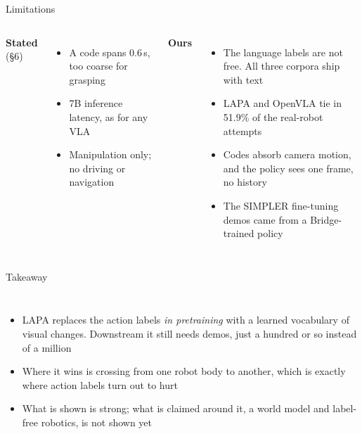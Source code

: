 \documentclass[aspectratio=169,12pt]{beamer}
\newcommand{\lapa}[1]{{\color{lapa}#1}}
\begin{document}
\begin{frame}{Limitations}
  \begin{columns}[t]
      {\small\bfseries Stated} {\scriptsize\color{mute}(\S6)}
      \footnotesize
      \begin{itemize}\setlength{\itemsep}{3pt}
        \item A code spans 0.6\,s, too coarse for grasping
        \item 7B inference latency, as for any VLA
        \item Manipulation only; no driving or navigation
      \end{itemize}
      {\small\bfseries Ours}
      \footnotesize
      \begin{itemize}\setlength{\itemsep}{3pt}
        \item The language labels are not free. All three corpora ship with text
        \item LAPA and OpenVLA tie in 51.9\% of the real-robot attempts
        \item Codes absorb camera motion, and the policy sees one frame, no history
        \item The SIMPLER fine-tuning demos came from a Bridge-trained policy
      \end{itemize}
  \end{columns}
\end{frame}

\begin{frame}{Takeaway}
  \vfill
  \begin{columns}
      \begin{itemize}\setlength{\itemsep}{10pt}
        \item LAPA replaces the action labels \emph{in pretraining} with a learned
          vocabulary of visual changes. Downstream it still needs demos, just a hundred
          or so instead of a million
        \item \lapa{Where it wins is crossing from one robot body to another, which is
          exactly where action labels turn out to hurt}
        \item What is shown is strong; what is claimed around it, a world model and
          label-free robotics, is not shown yet
      \end{itemize}
  \end{columns}
  \vfill
\end{frame}
\end{document}

